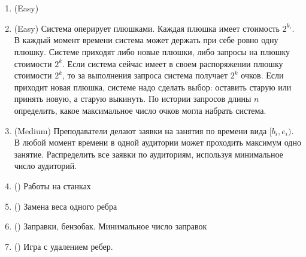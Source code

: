 \section{}

\begin{enumerate}

  \item (Easy)

	\item (Easy) Система оперирует плюшками. Каждая 
  плюшка имеет стоимость $2^{k_i}$. В каждый момент времени система
  может держать при себе ровно одну плюшку. Системе приходят либо 
  новые плюшки, либо запросы на плюшку стоимости $2^k$. Если система
  сейчас имеет в своем распоряжении плюшку стоимости $2^k$, то за 
  выполнения запроса система получает $2^k$ очков. Если приходит новая
  плюшка, системе надо сделать выбор: оставить старую или принять новую,
  а старую выкинуть. По истории запросов длины $n$ определить, какое 
  максимальное число очков могла набрать система.
	
  \item (Medium) Преподаватели делают заявки на занятия по времени вида $[b_i, e_i)$.
  В любой момент времени в одной аудитории может проходить максимум
  одно занятие. Распределить все заявки по аудиториям, используя 
  минимальное число аудиторий.

  \item () Работы на станках
  
  \item () Замена веса одного ребра

  \item () Заправки, бензобак. Минимальное число заправок

  \item () Игра с удалением ребер.
    
\end{enumerate}
